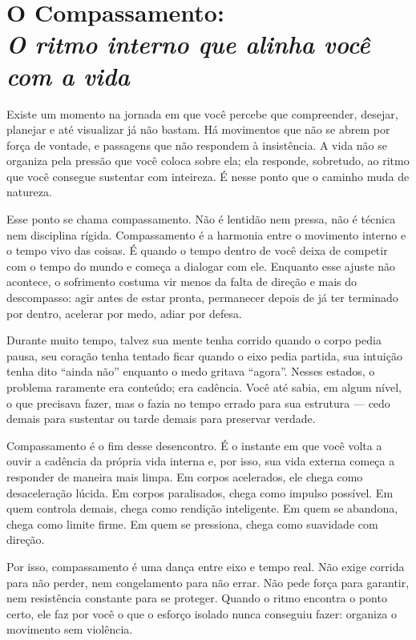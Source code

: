 \documentclass[12pt]{book}
\begin{document}
\chapter[O Compassamento: O ritmo interno que alinha você com a vida]{O Compassamento:\\[0.4ex]\large\itshape O ritmo interno que alinha você com a vida}

Existe um momento na jornada em que você percebe que compreender, desejar, planejar e até visualizar já não bastam. Há movimentos que não se abrem por força de vontade, e passagens que não respondem à insistência. A vida não se organiza pela pressão que você coloca sobre ela; ela responde, sobretudo, ao ritmo que você consegue sustentar com inteireza. É nesse ponto que o caminho muda de natureza.

Esse ponto se chama compassamento. Não é lentidão nem pressa, não é técnica nem disciplina rígida. Compassamento é a harmonia entre o movimento interno e o tempo vivo das coisas. É quando o tempo dentro de você deixa de competir com o tempo do mundo e começa a dialogar com ele. Enquanto esse ajuste não acontece, o sofrimento costuma vir menos da falta de direção e mais do descompasso: agir antes de estar pronta, permanecer depois de já ter terminado por dentro, acelerar por medo, adiar por defesa.

Durante muito tempo, talvez sua mente tenha corrido quando o corpo pedia pausa, seu coração tenha tentado ficar quando o eixo pedia partida, sua intuição tenha dito “ainda não” enquanto o medo gritava “agora”. Nesses estados, o problema raramente era conteúdo; era cadência. Você até sabia, em algum nível, o que precisava fazer, mas o fazia no tempo errado para sua estrutura — cedo demais para sustentar ou tarde demais para preservar verdade.

Compassamento é o fim desse desencontro. É o instante em que você volta a ouvir a cadência da própria vida interna e, por isso, sua vida externa começa a responder de maneira mais limpa. Em corpos acelerados, ele chega como desaceleração lúcida. Em corpos paralisados, chega como impulso possível. Em quem controla demais, chega como rendição inteligente. Em quem se abandona, chega como limite firme. Em quem se pressiona, chega como suavidade com direção.

Por isso, compassamento é uma dança entre eixo e tempo real. Não exige corrida para não perder, nem congelamento para não errar. Não pede força para garantir, nem resistência constante para se proteger. Quando o ritmo encontra o ponto certo, ele faz por você o que o esforço isolado nunca conseguiu fazer: organiza o movimento sem violência.
\end{document}
